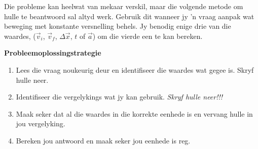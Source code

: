 Die probleme kan heelwat van mekaar verskil, maar die volgende metode om hulle te beantwoord sal altyd werk. Gebruik dit wanneer jy 'n vraag aanpak wat beweging met konstante versnelling behels. Jy benodig enige drie van die waardes, ($\vec{v}_{i}$, $\vec{v}_{f}$, $\Delta \vec{x}$, $t$ of $\vec{a}$) om die vierde een te kan bereken.\par
\textbf{Probleemoplossingstrategie}
\begin{enumerate}[noitemsep, label=\textbf{\arabic*}. ] 
    \item Lees die vraag noukeurig deur en identifiseer die waardes wat gegee is. Skryf hulle neer.
    \item Identifiseer die vergelykings wat jy kan gebruik. \textsl{Skryf hulle neer!!!}
    \item Maak seker dat al die waardes in die korrekte eenhede is en vervang hulle in jou vergelyking.
    \item Bereken jou antwoord en maak seker jou eenhede is reg.
\end{enumerate}

	\par
      \label{m38796*uid134}
            
